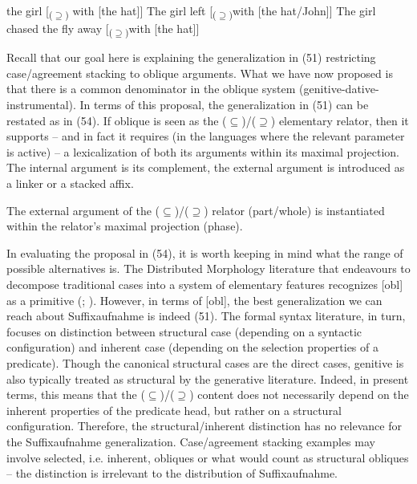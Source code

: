 \documentclass[output=paper]{langsci/langscibook}
\begin{document}
\ea%
    \label{ex:manzini:53}
    \ea  the girl [\textsubscript{($\supseteq$)} with [the hat]]
    \ex  The girl left [\textsubscript{($\supseteq$)}with [the hat/John]]
    \ex  The girl chased the fly away [\textsubscript{($\supseteq$)}with [the hat]]
    \z
\z
  
Recall that our goal here is explaining the generalization in (51) restricting case\slash agreement stacking to oblique arguments. What we have now proposed is that there is a common denominator in the oblique system (genitive-dative-instrumental). In terms of this proposal, the generalization in (51) can be restated as in (54). If oblique is seen as the ($\subseteq$)/($\supseteq$) elementary relator, then it supports – and in fact it requires (in the languages where the relevant parameter is active) – a lexicalization of both its arguments within its maximal projection. The internal argument is its complement, the external argument is introduced as a linker or a stacked affix.

\ea%
    \label{ex:manzini:54}
    The external argument of the ($\subseteq$)/($\supseteq$) relator (part/whole) is instantiated within the relator’s maximal projection (phase).
\z

In evaluating the proposal in (54), it is worth keeping in mind what the range of possible alternatives is. The Distributed Morphology literature that endeavours to decompose traditional cases into a system of elementary features recognizes [obl] as a primitive (\citealt{Halle1998}; \citealt{Calabrese2008}). However, in terms of [obl], the best generalization we can reach about Suffixaufnahme is indeed (51). The formal syntax literature, in turn, focuses on  distinction between structural case (depending on a syntactic configuration) and inherent case (depending on the selection properties of a predicate). Though the canonical structural cases are the direct cases, genitive is also typically treated as structural by the generative literature. Indeed, in present terms, this means that the ($\subseteq$)/($\supseteq$) content does not necessarily depend on the inherent properties of the predicate head, but rather on a structural configuration. Therefore, the structural\slash inherent distinction has no relevance for the Suffixaufnahme generalization. Case\slash agreement stacking examples may involve selected, i.e. inherent, obliques or what would count as structural obliques  – the distinction is irrelevant to the distribution of Suffixaufnahme. 
\end{document}
